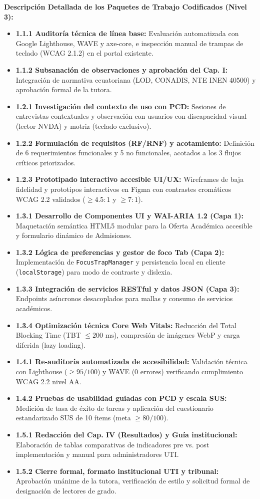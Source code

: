 \documentclass[10pt,a4paper]{article}
\begin{document}
\vspace{-0.2cm}
\textbf{Descripción Detallada de los Paquetes de Trabajo Codificados (Nivel 3):}
\begin{itemize}\setlength\itemsep{0.5pt}\footnotesize
    \item \textbf{1.1.1 Auditoría técnica de línea base:} Evaluación automatizada con Google Lighthouse, WAVE y axe-core, e inspección manual de trampas de teclado (WCAG 2.1.2) en el portal existente.
    \item \textbf{1.1.2 Subsanación de observaciones y aprobación del Cap. I:} Integración de normativa ecuatoriana (LOD, CONADIS, NTE INEN 40500) y aprobación formal de la tutora.
    \item \textbf{1.2.1 Investigación del contexto de uso con PCD:} Sesiones de entrevistas contextuales y observación con usuarios con discapacidad visual (lector NVDA) y motriz (teclado exclusivo).
    \item \textbf{1.2.2 Formulación de requisitos (RF/RNF) y acotamiento:} Definición de 6 requerimientos funcionales y 5 no funcionales, acotados a los 3 flujos críticos priorizados.
    \item \textbf{1.2.3 Prototipado interactivo accesible UI/UX:} Wireframes de baja fidelidad y prototipos interactivos en Figma con contrastes cromáticos WCAG 2.2 validados ($\ge 4.5:1$ y $\ge 7:1$).
    \item \textbf{1.3.1 Desarrollo de Componentes UI y WAI-ARIA 1.2 (Capa 1):} Maquetación semántica HTML5 modular para la Oferta Académica accesible y formulario dinámico de Admisiones.
    \item \textbf{1.3.2 Lógica de preferencias y gestor de foco Tab (Capa 2):} Implementación de \texttt{FocusTrapManager} y persistencia local en cliente (\texttt{localStorage}) para modo de contraste y dislexia.
    \item \textbf{1.3.3 Integración de servicios RESTful y datos JSON (Capa 3):} Endpoints asíncronos desacoplados para mallas y consumo de servicios académicos.
    \item \textbf{1.3.4 Optimización técnica Core Web Vitals:} Reducción del Total Blocking Time (TBT $\le 200\text{ ms}$), compresión de imágenes WebP y carga diferida (lazy loading).
    \item \textbf{1.4.1 Re-auditoría automatizada de accesibilidad:} Validación técnica con Lighthouse ($\ge 95/100$) y WAVE (0 errores) verificando cumplimiento WCAG 2.2 nivel AA.
    \item \textbf{1.4.2 Pruebas de usabilidad guiadas con PCD y escala SUS:} Medición de tasa de éxito de tareas y aplicación del cuestionario estandarizado SUS de 10 ítems (meta $\ge 80/100$).
    \item \textbf{1.5.1 Redacción del Cap. IV (Resultados) y Guía institucional:} Elaboración de tablas comparativas de indicadores pre vs. post implementación y manual para administradores UTI.
    \item \textbf{1.5.2 Cierre formal, formato institucional UTI y tribunal:} Aprobación unánime de la tutora, verificación de estilo y solicitud formal de designación de lectores de grado.
\end{itemize}
\end{document}
